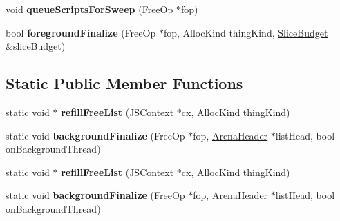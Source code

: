 \begin{DoxyCompactItemize}
\item 
\hypertarget{structjs_1_1gc_1_1_arena_lists_a8fedef6bd6c8388587c8c2008ce2573e}{void {\bfseries queue\-Scripts\-For\-Sweep} (Free\-Op $\ast$fop)}\label{structjs_1_1gc_1_1_arena_lists_a8fedef6bd6c8388587c8c2008ce2573e}

\item 
\hypertarget{structjs_1_1gc_1_1_arena_lists_aeb25ed411579c58c0c259b85bea32254}{bool {\bfseries foreground\-Finalize} (Free\-Op $\ast$fop, Alloc\-Kind thing\-Kind, \hyperlink{structjs_1_1_slice_budget}{Slice\-Budget} \&slice\-Budget)}\label{structjs_1_1gc_1_1_arena_lists_aeb25ed411579c58c0c259b85bea32254}

\end{DoxyCompactItemize}
\subsection*{Static Public Member Functions}
\begin{DoxyCompactItemize}
\item 
\hypertarget{structjs_1_1gc_1_1_arena_lists_ac4c7f694cb8dbe81bde24deb4600e15f}{static void $\ast$ {\bfseries refill\-Free\-List} (J\-S\-Context $\ast$cx, Alloc\-Kind thing\-Kind)}\label{structjs_1_1gc_1_1_arena_lists_ac4c7f694cb8dbe81bde24deb4600e15f}

\item 
\hypertarget{structjs_1_1gc_1_1_arena_lists_a349b6c94d6ebea392174b28de302a27c}{static void {\bfseries background\-Finalize} (Free\-Op $\ast$fop, \hyperlink{structjs_1_1gc_1_1_arena_header}{Arena\-Header} $\ast$list\-Head, bool on\-Background\-Thread)}\label{structjs_1_1gc_1_1_arena_lists_a349b6c94d6ebea392174b28de302a27c}

\item 
\hypertarget{structjs_1_1gc_1_1_arena_lists_ac4c7f694cb8dbe81bde24deb4600e15f}{static void $\ast$ {\bfseries refill\-Free\-List} (J\-S\-Context $\ast$cx, Alloc\-Kind thing\-Kind)}\label{structjs_1_1gc_1_1_arena_lists_ac4c7f694cb8dbe81bde24deb4600e15f}

\item 
\hypertarget{structjs_1_1gc_1_1_arena_lists_a349b6c94d6ebea392174b28de302a27c}{static void {\bfseries background\-Finalize} (Free\-Op $\ast$fop, \hyperlink{structjs_1_1gc_1_1_arena_header}{Arena\-Header} $\ast$list\-Head, bool on\-Background\-Thread)}\label{structjs_1_1gc_1_1_arena_lists_a349b6c94d6ebea392174b28de302a27c}

\end{DoxyCompactItemize}
